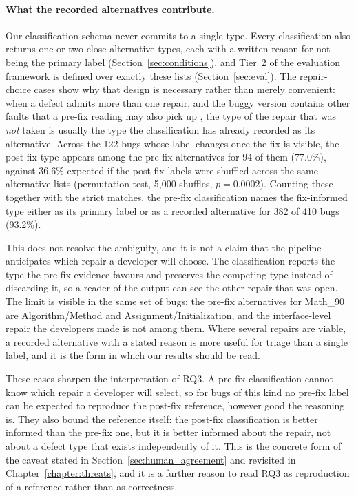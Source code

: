 \documentclass{iutbscthesis}
\begin{document}
\paragraph{What the recorded alternatives contribute.} Our classification schema never commits to a single type. Every classification also returns one or two close alternative types, each with a written reason for not being the primary label (Section~\ref{sec:conditions}), and Tier~2 of the evaluation framework is defined over exactly these lists (Section~\ref{sec:eval}). The repair-choice cases show why that design is necessary rather than merely convenient: when a defect admits more than one repair, and the buggy version contains other faults that a pre-fix reading may also pick up \cite{callaghan2024mf}, the type of the repair that was \emph{not} taken is usually the type the classification has already recorded as its alternative. Across the 122 bugs whose label changes once the fix is visible, the post-fix type appears among the pre-fix alternatives for 94 of them (77.0\%), against 36.6\% expected if the post-fix labels were shuffled across the same alternative lists (permutation test, 5,000 shuffles, $p = 0.0002$). Counting these together with the strict matches, the pre-fix classification names the fix-informed type either as its primary label or as a recorded alternative for 382 of 410 bugs (93.2\%).

This does not resolve the ambiguity, and it is not a claim that the pipeline anticipates which repair a developer will choose. The classification reports the type the pre-fix evidence favours and preserves the competing type instead of discarding it, so a reader of the output can see the other repair that was open. The limit is visible in the same set of bugs: the pre-fix alternatives for Math\_90 are Algorithm/Method and Assignment/\allowbreak Initialization, and the interface-level repair the developers made is not among them. Where several repairs are viable, a recorded alternative with a stated reason is more useful for triage than a single label, and it is the form in which our results should be read.

These cases sharpen the interpretation of RQ3. A pre-fix classification cannot know which repair a developer will select, so for bugs of this kind no pre-fix label can be expected to reproduce the post-fix reference, however good the reasoning is. They also bound the reference itself: the post-fix classification is better informed than the pre-fix one, but it is better informed about the repair, not about a defect type that exists independently of it. This is the concrete form of the caveat stated in Section~\ref{sec:human_agreement} and revisited in Chapter~\ref{chapter:threats}, and it is a further reason to read RQ3 as reproduction of a reference rather than as correctness.
\end{document}
